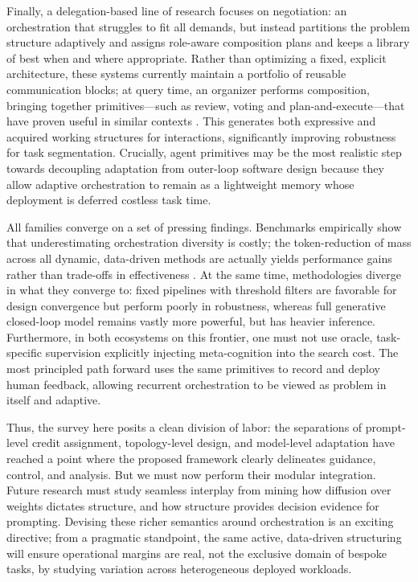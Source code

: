 \documentclass[11pt,a4paper]{article}
\begin{document}
Finally, a delegation-based line of research focuses on negotiation: an orchestration that struggles to fit all demands, but instead partitions the problem structure adaptively and assigns role-aware composition plans \cite{arxiv:1204.1581v1} and keeps a library of best when and where appropriate. Rather than optimizing a fixed, explicit architecture, these systems currently maintain a portfolio of reusable communication blocks; at query time, an organizer performs composition, bringing together primitives---such as review, voting and plan-and-execute---that have proven useful in similar contexts \cite{arxiv:2602.03695v2}. This generates both expressive and acquired working structures for interactions, significantly improving robustness for task segmentation. Crucially, agent primitives may be the most realistic step towards decoupling adaptation from outer-loop software design because they allow adaptive orchestration to remain as a lightweight memory whose deployment is deferred costless task time.

All families converge on a set of pressing findings. Benchmarks empirically show that underestimating orchestration diversity is costly; the token-reduction of mass across all dynamic, data-driven methods are actually yields performance gains rather than trade-offs in effectiveness \cite{arxiv:2410.02506v1}. At the same time, methodologies diverge in what they converge to: fixed pipelines with threshold filters are favorable for design convergence but perform poorly in robustness, whereas full generative closed-loop model remains vastly more powerful, but has heavier inference. Furthermore, in both ecosystems on this frontier, one must not use oracle, task-specific supervision explicitly injecting meta-cognition into the search cost. The most principled path forward uses the same primitives to record and deploy human feedback, allowing recurrent orchestration to be viewed as problem in itself and adaptive.

Thus, the survey here posits a clean division of labor: the separations of prompt-level credit assignment, topology-level design, and model-level adaptation have reached a point where the proposed framework clearly delineates guidance, control, and analysis. But we must now perform their modular integration. Future research must study seamless interplay from mining how diffusion over weights dictates structure, and how structure provides decision evidence for prompting. Devising these richer semantics around orchestration is an exciting directive; from a pragmatic standpoint, the same active, data-driven structuring will ensure operational margins are real, not the exclusive domain of bespoke tasks, by studying variation across heterogeneous deployed workloads.
\end{document}
